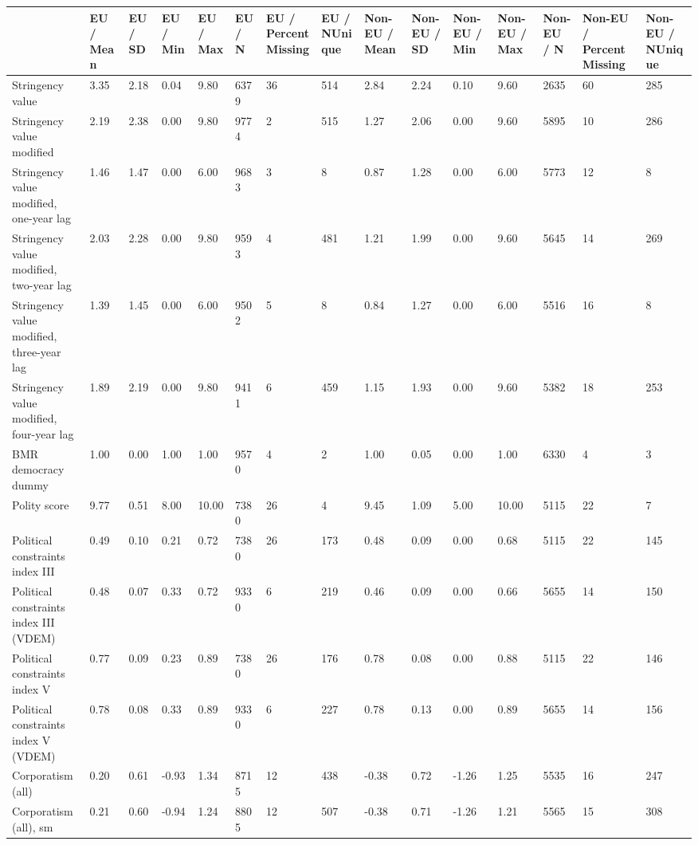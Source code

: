 
\begin{longtable}{lllllllllllllll}
\toprule
  & EU / Mean & EU / SD & EU / Min & EU / Max & EU / N & EU / PercentMissing & EU / NUnique & Non-EU / Mean & Non-EU / SD & Non-EU / Min & Non-EU / Max & Non-EU / N & Non-EU / PercentMissing & Non-EU / NUnique\\
\midrule
Stringency value & 3.35 & 2.18 & 0.04 & 9.80 & 6379 & 36 & 514 & 2.84 & 2.24 & 0.10 & 9.60 & 2635 & 60 & 285\\
Stringency value modified & 2.19 & 2.38 & 0.00 & 9.80 & 9774 & 2 & 515 & 1.27 & 2.06 & 0.00 & 9.60 & 5895 & 10 & 286\\
Stringency value modified, one-year lag & 1.46 & 1.47 & 0.00 & 6.00 & 9683 & 3 & 8 & 0.87 & 1.28 & 0.00 & 6.00 & 5773 & 12 & 8\\
Stringency value modified, two-year lag & 2.03 & 2.28 & 0.00 & 9.80 & 9593 & 4 & 481 & 1.21 & 1.99 & 0.00 & 9.60 & 5645 & 14 & 269\\
Stringency value modified, three-year lag & 1.39 & 1.45 & 0.00 & 6.00 & 9502 & 5 & 8 & 0.84 & 1.27 & 0.00 & 6.00 & 5516 & 16 & 8\\
\addlinespace
Stringency value modified, four-year lag & 1.89 & 2.19 & 0.00 & 9.80 & 9411 & 6 & 459 & 1.15 & 1.93 & 0.00 & 9.60 & 5382 & 18 & 253\\
BMR democracy dummy & 1.00 & 0.00 & 1.00 & 1.00 & 9570 & 4 & 2 & 1.00 & 0.05 & 0.00 & 1.00 & 6330 & 4 & 3\\
Polity score & 9.77 & 0.51 & 8.00 & 10.00 & 7380 & 26 & 4 & 9.45 & 1.09 & 5.00 & 10.00 & 5115 & 22 & 7\\
Political constraints index III & 0.49 & 0.10 & 0.21 & 0.72 & 7380 & 26 & 173 & 0.48 & 0.09 & 0.00 & 0.68 & 5115 & 22 & 145\\
Political constraints index III (VDEM) & 0.48 & 0.07 & 0.33 & 0.72 & 9330 & 6 & 219 & 0.46 & 0.09 & 0.00 & 0.66 & 5655 & 14 & 150\\
\addlinespace
Political constraints index V & 0.77 & 0.09 & 0.23 & 0.89 & 7380 & 26 & 176 & 0.78 & 0.08 & 0.00 & 0.88 & 5115 & 22 & 146\\
Political constraints index V (VDEM) & 0.78 & 0.08 & 0.33 & 0.89 & 9330 & 6 & 227 & 0.78 & 0.13 & 0.00 & 0.89 & 5655 & 14 & 156\\
Corporatism (all) & 0.20 & 0.61 & -0.93 & 1.34 & 8715 & 12 & 438 & -0.38 & 0.72 & -1.26 & 1.25 & 5535 & 16 & 247\\
Corporatism (all), sm & 0.21 & 0.60 & -0.94 & 1.24 & 8805 & 12 & 507 & -0.38 & 0.71 & -1.26 & 1.21 & 5565 & 15 & 308\\

\end{longtable}
